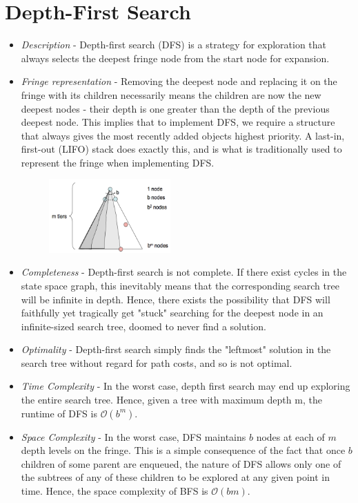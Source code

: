 \documentclass{article}[letterpaper]
\begin{document}
\section*{Depth-First Search}
\begin{itemize}
\item \textit{Description} - Depth-first search (DFS) is a strategy for exploration that always selects the deepest
fringe node from the start node for expansion.

\item \textit{Fringe representation} - Removing the deepest node and replacing it on the fringe with its children
necessarily means the children are now the new deepest nodes - their depth is one greater than the
depth of the previous deepest node. This implies that to implement DFS, we require a structure that
always gives the most recently added objects highest priority. A last-in, first-out (LIFO) stack does
exactly this, and is what is traditionally used to represent the fringe when implementing DFS.

\begin{figure}
\centering
\includegraphics[width=0.44\textwidth]{figs/DFS} 
\end{figure}

\item \textit{Completeness} - Depth-first search is not complete. If there exist cycles in the state space graph, this
inevitably means that the corresponding search tree will be infinite in depth. Hence, there exists the
possibility that DFS will faithfully yet tragically get "stuck" searching for the deepest node in an
infinite-sized search tree, doomed to never find a solution.

\item \textit{Optimality} - Depth-first search simply finds the "leftmost" solution in the search tree without regard
for path costs, and so is not optimal.

\item \textit{Time Complexity} - In the worst case, depth first search may end up exploring the entire search tree.
Hence, given a tree with maximum depth m, the runtime of DFS is $\mathcal{O}(b^m)$.

\item \textit{Space Complexity} - In the worst case, DFS maintains $b$ nodes at each of $m$ depth levels on the fringe.
This is a simple consequence of the fact that once $b$ children of some parent are enqueued, the nature
of DFS allows only one of the subtrees of any of these children to be explored at any given point in
time. Hence, the space complexity of BFS is $\mathcal{O}(bm)$.
\end{itemize}
\end{document}
